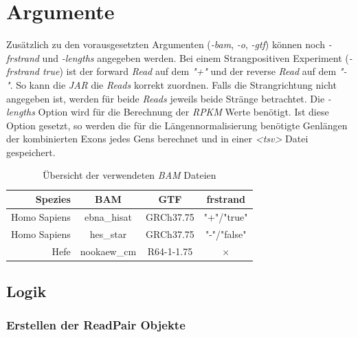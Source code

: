\documentclass[12pt]{article}
\begin{document}
\section{Argumente}\label{sec:argumente}
Zusätzlich zu den vorausgesetzten Argumenten (\textit{-bam}, \textit{-o}, \textit{-gtf}) können noch \textit{-frstrand} und
\textit{-lengths} angegeben werden. 
Bei einem Strangpositiven Experiment (\textit{-frstrand true}) ist der forward \textit{Read} auf dem \textit{"+"} und der reverse \textit{Read} auf dem
\textit{"-"}. So kann die \textit{JAR} die \textit{Reads} korrekt zuordnen. 
Falls die Strangrichtung nicht angegeben ist, werden für beide \textit{Reads} jeweils beide Stränge betrachtet.
Die \textit{-lengths} Option wird für die Berechnung der \textit{RPKM} Werte benötigt. 
Ist diese Option gesetzt, so werden die für die Längennormalisierung benötigte Genlängen der kombinierten Exons jedes
Gens berechnet und in einer \textit{<tsv>} Datei gespeichert.
\begin{table}[htpb]
    \centering
    \caption{Übersicht der verwendeten \textit{BAM} Dateien}
    \label{tab:baminfo}
\begin{tabular}{r|c|c|c}
    \textbf{Spezies}   & \textbf{BAM} & \textbf{GTF} & \textbf{frstrand}\\ \hline
    Homo Sapiens & ebna\_hisat &GRCh37.75 & "+"/"true" \\
     Homo Sapiens & hes\_star & GRCh37.75 & "-"/"false"\\
     Hefe &  nookaew\_cm & R64-1-1.75 & $\times$ \\
\end{tabular}
\end{table}

\subsection{Logik}
\subsubsection{Erstellen der ReadPair Objekte}
\end{document}
